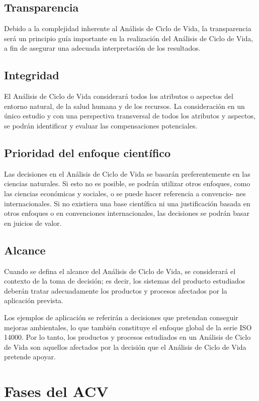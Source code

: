 \subsection{Transparencia}
Debido a la complejidad inherente al Análisis de Ciclo de Vida, la transparencia será un principio guía importante en la realización del Análisis de Ciclo de Vida, a fin de asegurar una adecuada interpretación de los resultados.

\subsection{Integridad}
El Análisis de Ciclo de Vida considerará todos los atributos o aspectos del entorno natural, de la salud humana y de los recursos. La consideración en un único estudio y con una perspectiva transversal de todos los atributos y aspectos, se podrán identificar y evaluar las compensaciones potenciales.

\subsection{Prioridad del enfoque científico}
Las decisiones en el Análisis de Ciclo de Vida se basarán preferentemente en las ciencias naturales. Si esto no es posible, se podrán utilizar otros enfoques, como las ciencias económicas y sociales, o se puede hacer referencia a convencio- nes internacionales. Si no existiera una base científica ni una justificación basada en otros enfoques o en convenciones internacionales, las decisiones se podrán basar en juicios de valor.

\subsection{Alcance}
Cuando se defina el alcance del Análisis de Ciclo de Vida, se considerará el contexto de la toma de decisión; es decir, los sistemas del producto estudiados deberán tratar adecuadamente los productos y procesos afectados por la aplicación prevista.

Los ejemplos de aplicación se referirán a decisiones que pretendan conseguir mejoras ambientales, lo que también constituye el enfoque global de la serie ISO 14000. Por lo tanto, los productos y procesos estudiados en un Análisis de Ciclo de Vida son aquellos afectados por la decisión que el Análisis de Ciclo de Vida pretende apoyar.

\section{Fases del ACV}

